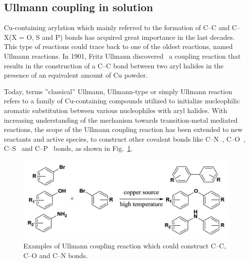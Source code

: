 \documentclass[%
 reprint,
 amsmath,amssymb,
 aps,
prb,
]{revtex4-2}
\begin{document}
\subsection{\label{sec:level2}Ullmann coupling in solution}

Cu-containing arylation which mainly referred to the formation of C--C and C--X(X = O, S and P) bonds has acquired great importance in the last decades. This type of reactions could trace back to one of the oldest reactions, named Ullmann reactions.
In 1901, Fritz Ullmann discovered~\cite{ullmann_01} a coupling reaction that results in the construction of a C--C bond between two aryl halides in the presence of an equivalent amount of Cu powder.

Today, terms ''classical'' Ullmann, Ullmann-type or simply Ullmann reaction refers to a family of Cu-containing compounds utilized to initialize nucleophilic aromatic substitution between various nucleophiles with aryl halides.
With increasing understanding of the mechanism towards transition-metal mediated reactions, the scope of the Ullmann coupling reaction has been extended to new reactants and active species, to construct other covalent bonds like C--N~\cite{ullmann_02, ullmann_03}, C--O~\cite{ullmann_04}, C--S~\cite{ullmann_05} and C--P~\cite{ullmann_21,ullmann_22} bonds, as shown in Fig.~\ref{fig:UllmannCoupling}\cite{ullmann_30}.
\begin{figure}[htb]
\centering
\includegraphics[width=0.75\columnwidth]{Fig/classical.png}%
\caption{Examples of Ullmann coupling reaction which could construct C--C, C--O and C--N bonds.}
\label{fig:UllmannCoupling}
\end{figure}
\end{document}
